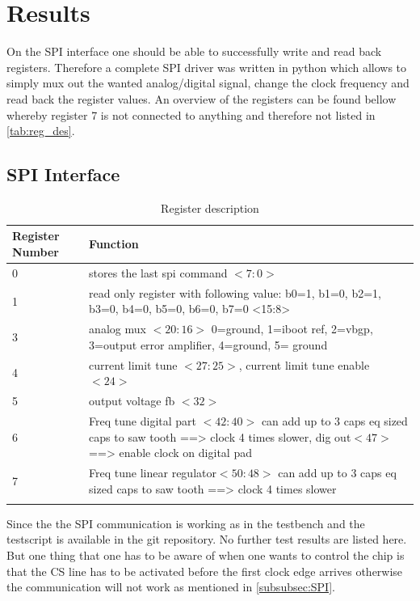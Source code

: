 \section{Results}
\label{sec:results}
On the SPI interface one should be able to successfully write and read back registers. Therefore a complete SPI driver was written in python which allows to simply mux out the wanted analog/digital signal, change the clock frequency and read back the register values. An overview of the registers can be found bellow whereby register 7 is not connected to anything and therefore not listed in \autoref{tab:reg_des}.
\subsection{SPI Interface}
\begin{longtable}{|p{3.5cm}|p{10.5cm}|}
	\hline
	\rowcolor{lightgray}
	\textbf{Register Number} &\textbf{Function} \\ \hline
	0 & stores the last spi command $<7:0>$\\ \hline
    1 & read only register with following value: b0=1, b1=0, b2=1, b3=0, b4=0, b5=0, b6=0, b7=0 <15:8> \\ \hline
    3 & analog mux $<20:16>$ 0=ground, 1=iboot ref, 2=vbgp, 3=output error amplifier, 4=ground,  5= ground \\ \hline
	4 & current limit tune $<27:25>$, current limit tune enable $<24>$ \\ \hline
	5 & output voltage fb $<32>$ \\ \hline
	6 & Freq tune digital part $<42:40>$ can add up to 3 caps eq sized caps to saw tooth ==> clock 4 times slower, dig out$<47>$ ==> enable clock on digital pad\\ \hline
    7 & Freq tune linear regulator$<50:48>$ can add up to 3 caps eq sized caps to saw tooth ==> clock 4 times slower \\ \hline
	\caption{Register description} %
	\label{tab:reg_des}
\end{longtable}
Since the the SPI communication is working as in the testbench and the testscript is available in the git repository. No further test results are listed here. But one thing that one has to be aware of when one wants to control the chip is that the CS line has to be activated before the first clock edge arrives otherwise the communication will not work as mentioned in \autoref{subsubsec:SPI}.

